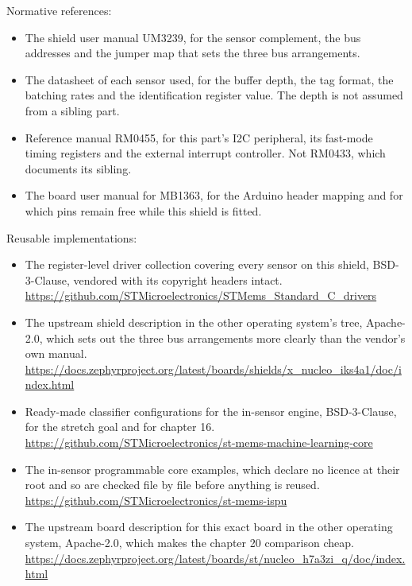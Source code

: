 Normative references:
\begin{itemize}
\item The shield user manual UM3239, for the sensor complement, the bus
addresses and the jumper map that sets the three bus arrangements.
\item The datasheet of each sensor used, for the buffer depth, the tag format,
the batching rates and the identification register value. The depth is not
assumed from a sibling part.
\item Reference manual RM0455, for this part's I2C peripheral, its fast-mode
timing registers and the external interrupt controller. Not RM0433, which
documents its sibling.
\item The board user manual for MB1363, for the Arduino header mapping and for
which pins remain free while this shield is fitted.
\end{itemize}

Reusable implementations:
\begin{itemize}
\item The register-level driver collection covering every sensor on this shield,
BSD-3-Clause, vendored with its copyright headers intact.\newline
\url{https://github.com/STMicroelectronics/STMems_Standard_C_drivers}
\item The upstream shield description in the other operating system's tree,
Apache-2.0, which sets out the three bus arrangements more clearly than the
vendor's own manual.\newline
\url{https://docs.zephyrproject.org/latest/boards/shields/x_nucleo_iks4a1/doc/index.html}
\item Ready-made classifier configurations for the in-sensor engine,
BSD-3-Clause, for the stretch goal and for chapter 16.\newline
\url{https://github.com/STMicroelectronics/st-mems-machine-learning-core}
\item The in-sensor programmable core examples, which declare no licence at
their root and so are checked file by file before anything is reused.\newline
\url{https://github.com/STMicroelectronics/st-mems-ispu}
\item The upstream board description for this exact board in the other operating
system, Apache-2.0, which makes the chapter 20 comparison cheap.\newline
\url{https://docs.zephyrproject.org/latest/boards/st/nucleo_h7a3zi_q/doc/index.html}
\end{itemize}
